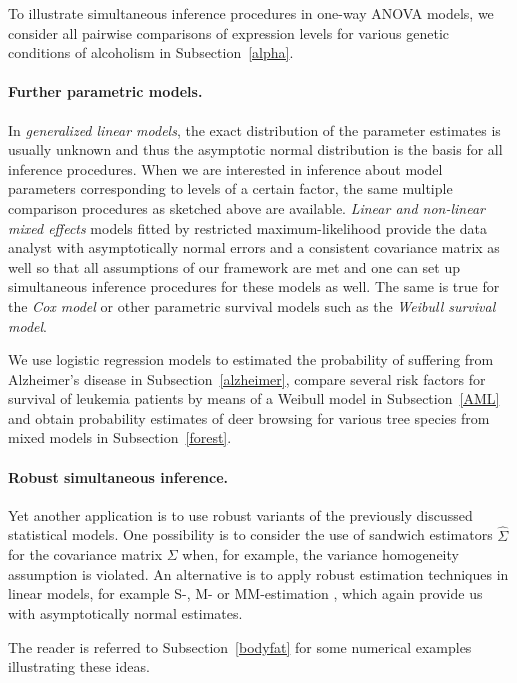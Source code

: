 \documentclass[12pt]{article}
\begin{document}
To illustrate simultaneous inference procedures in one-way ANOVA models, we
consider all pairwise comparisons of expression levels for various genetic conditions
of alcoholism in Subsection~\ref{alpha}.

\paragraph{Further parametric models.}

In \emph{generalized linear models}, the exact distribution of the parameter estimates
is usually unknown and thus the asymptotic normal distribution is the basis for all
inference procedures. When we are interested in inference about model
parameters corresponding to levels of a certain factor, the same multiple
comparison procedures as sketched above are available.
\emph{Linear and non-linear mixed effects} models fitted by restricted
maximum-likelihood provide
the data analyst with asymptotically normal errors and a consistent
covariance matrix as well so that all assumptions of our framework
are met and one can set up simultaneous inference procedures
for these models as well.
The same is true for the \emph{Cox model} or other parametric survival models
such as the \emph{Weibull survival model}.

We use logistic regression models to estimated the probability of suffering
from Alzheimer's disease in Subsection~\ref{alzheimer}, compare several risk
factors for survival of leukemia patients by means of a Weibull model in
Subsection~\ref{AML} and obtain probability estimates of deer browsing for
various tree species from mixed models in Subsection~\ref{forest}.

\paragraph{Robust simultaneous inference.}

Yet another application is to use robust variants of the previously discussed statistical models.
One possibility is to consider the use
of sandwich estimators $\hat{\Sigma}$ for the covariance matrix $\Sigma$ when, for example,
the variance homogeneity assumption is violated.
An alternative is to apply robust estimation techniques in 
linear models, for example S-, M- or MM-estimation \citep[see][for
example]{RousseeuwLeroy2003, mfluc:Stefanski+Boos:2002, Yohai1987, mfluc:White:1994}, 
which again provide us with asymptotically normal estimates.

The reader is referred to Subsection~\ref{bodyfat} for some numerical 
examples illustrating these ideas.
\end{document}
